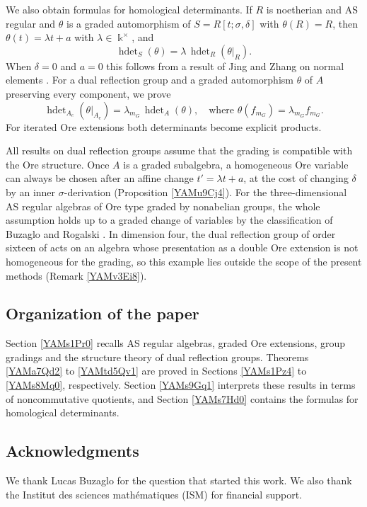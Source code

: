 \documentclass[reqno]{amsart}
\numberwithin{equation}{section}
\theoremstyle{definition}
\theoremstyle{remark}
\theoremstyle{plain}
\newcommand{\kk}{\Bbbk}
\DeclareMathOperator{\hdet}{hdet}
\begin{document}
We also obtain formulas for homological determinants. If $R$ is noetherian and AS regular and $\theta$ is a graded automorphism of $S=R[t;\sigma,\delta]$ with $\theta(R)=R$, then $\theta(t)=\lambda t+a$ with $\lambda\in\kk^\times$, and
\[
\hdet_S(\theta)=\lambda\,\hdet_R(\theta|_R).
\]
When $\delta=0$ and $a=0$ this follows from a result of Jing and Zhang on normal elements \cite[Proposition 2.4]{JiZ}. For a dual reflection group and a graded automorphism $\theta$ of $A$ preserving every component, we prove
\[
\hdet_{A_e}(\theta|_{A_e})=\lambda_{m_G}\,\hdet_A(\theta),\quad\text{where }\theta(f_{m_G})=\lambda_{m_G}f_{m_G}.
\]
For iterated Ore extensions both determinants become explicit products.

All results on dual reflection groups assume that the grading is compatible with the Ore structure. Once $A$ is a graded subalgebra, a homogeneous Ore variable can always be chosen after an affine change $t'=\lambda t+a$, at the cost of changing $\delta$ by an inner $\sigma$-derivation (Proposition \ref{YAMu9Cj4}). For the three-dimensional AS regular algebras of Ore type graded by nonabelian groups, the whole assumption holds up to a graded change of variables by the classification of Buzaglo and Rogalski \cite[Theorem 3.4]{BR}. In dimension four, the dual reflection group of order sixteen of \cite[\S3.1]{GKMV} acts on an algebra whose presentation as a double Ore extension is not homogeneous for the grading, so this example lies outside the scope of the present methods (Remark \ref{YAMv3Ei8}).

\subsection*{Organization of the paper} Section \ref{YAMs1Pr0} recalls AS regular algebras, graded Ore extensions, group gradings and the structure theory of dual reflection groups. Theorems \ref{YAMa7Qd2} to \ref{YAMtd5Qv1} are proved in Sections \ref{YAMs1Pz4} to \ref{YAMs8Mq0}, respectively. Section \ref{YAMs9Gq1} interprets these results in terms of noncommutative quotients, and Section \ref{YAMs7Hd0} contains the formulas for homological determinants.

\subsection*{Acknowledgments}

We thank Lucas Buzaglo for the question that started this work. We also thank the Institut des sciences math\'ematiques (ISM) for financial support.
\end{document}
